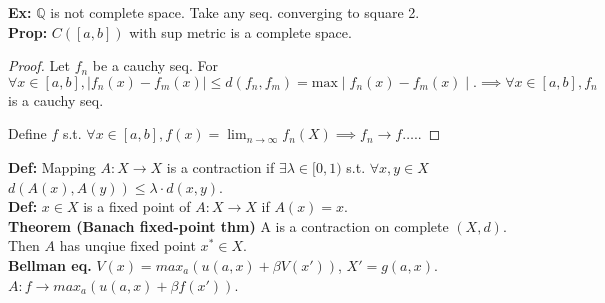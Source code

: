 \documentclass[a4paper]{article}
\newcommand{\Q}{\mathbb{Q}}
\begin{document}
\textbf{Ex:} $\Q$ is not complete space. Take any seq. converging to square 2.\\


\textbf{Prop:} $C\left( [a,b] \right) $ with sup metric is a complete space.
\begin{proof}
	Let $f_n$ be a cauchy seq. For $\forall x \in [a,b],  \mid f_n (x) - f_m (x)  \mid  \le  d(f_n, f_m) = \text{max}  \mid f_n (x) - f_m (x)  \mid . \implies \forall x \in [a,b], f_n$ is a cauchy seq. 

	Define $f$ s.t. $\forall x \in [a,b], f(x) = \lim_{n \to \infty} f_n (X) \implies f_n \to f\ldots..$
\end{proof}

\textbf{Def:} Mapping $A:X \to X$ is a contraction if $\exists \lambda \in [0,1)$ s.t. $\forall x, y \in X$ $d\left( A(x), A(y) \right) \le  \lambda \cdot d(x,y)$.\\

\textbf{Def:} $x \in X$ is a fixed point of $A: X \to X$ if $A(x)=x.$\\

\textbf{Theorem (Banach fixed-point thm)} A is a contraction on complete  $(X,d)$. Then $A$ has unqiue fixed point $x^{*} \in X.$ \\


\textbf{Bellman eq.} $V(x) = max_a \left( u(a,x) + \beta V(x') \right) $, $X' = g(a,x).$  $A:f \to max_a \left( u(a,x) + \beta f(x') \right) $.
\end{document}
